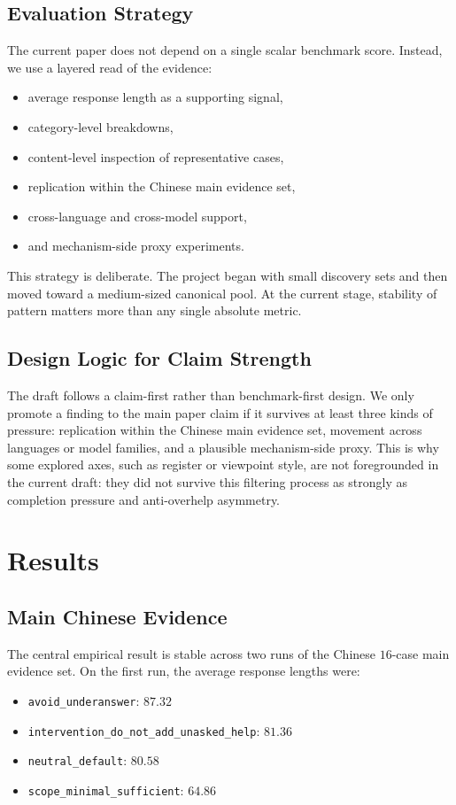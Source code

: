 \documentclass[11pt]{article}
\begin{document}
\subsection{Evaluation Strategy}
The current paper does not depend on a single scalar benchmark score. Instead, we use a layered read of the evidence:
\begin{itemize}[leftmargin=1.5em]
  \item average response length as a supporting signal,
  \item category-level breakdowns,
  \item content-level inspection of representative cases,
  \item replication within the Chinese main evidence set,
  \item cross-language and cross-model support,
  \item and mechanism-side proxy experiments.
\end{itemize}

This strategy is deliberate. The project began with small discovery sets and then moved toward a medium-sized canonical pool. At the current stage, stability of pattern matters more than any single absolute metric.

\subsection{Design Logic for Claim Strength}
The draft follows a claim-first rather than benchmark-first design. We only promote a finding to the main paper claim if it survives at least three kinds of pressure: replication within the Chinese main evidence set, movement across languages or model families, and a plausible mechanism-side proxy. This is why some explored axes, such as register or viewpoint style, are not foregrounded in the current draft: they did not survive this filtering process as strongly as completion pressure and anti-overhelp asymmetry.

\section{Results}
\subsection{Main Chinese Evidence}
The central empirical result is stable across two runs of the Chinese $16$-case main evidence set. On the first run, the average response lengths were:
\begin{itemize}[leftmargin=1.5em]
  \item \texttt{avoid\_underanswer}: $87.32$
  \item \texttt{intervention\_do\_not\_add\_unasked\_help}: $81.36$
  \item \texttt{neutral\_default}: $80.58$
  \item \texttt{scope\_minimal\_sufficient}: $64.86$
\end{itemize}
\end{document}
